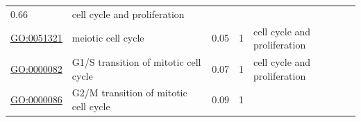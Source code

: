 \documentclass[
]{article}
\begin{document}
\begin{longtable}[]{@{}lllll@{}}
\begin{minipage}[t]{0.17\columnwidth}
0.66\strut
\end{minipage} & \begin{minipage}[t]{0.17\columnwidth}\raggedright
cell cycle and proliferation\strut
\end{minipage}\tabularnewline
\begin{minipage}[t]{0.17\columnwidth}\raggedright
\url{GO:0051321}\strut
\end{minipage} & \begin{minipage}[t]{0.17\columnwidth}\raggedright
meiotic cell cycle\strut
\end{minipage} & \begin{minipage}[t]{0.17\columnwidth}\raggedright
0.05\strut
\end{minipage} & \begin{minipage}[t]{0.17\columnwidth}\raggedright
1\strut
\end{minipage} & \begin{minipage}[t]{0.17\columnwidth}\raggedright
cell cycle and proliferation\strut
\end{minipage}\tabularnewline
\begin{minipage}[t]{0.17\columnwidth}\raggedright
\url{GO:0000082}\strut
\end{minipage} & \begin{minipage}[t]{0.17\columnwidth}\raggedright
G1/S transition of mitotic cell cycle\strut
\end{minipage} & \begin{minipage}[t]{0.17\columnwidth}\raggedright
0.07\strut
\end{minipage} & \begin{minipage}[t]{0.17\columnwidth}\raggedright
1\strut
\end{minipage} & \begin{minipage}[t]{0.17\columnwidth}\raggedright
cell cycle and proliferation\strut
\end{minipage}\tabularnewline
\begin{minipage}[t]{0.17\columnwidth}\raggedright
\url{GO:0000086}\strut
\end{minipage} & \begin{minipage}[t]{0.17\columnwidth}\raggedright
G2/M transition of mitotic cell cycle\strut
\end{minipage} & \begin{minipage}[t]{0.17\columnwidth}\raggedright
0.09\strut
\end{minipage} & \begin{minipage}[t]{0.17\columnwidth}\raggedright
1\strut
\end{minipage} & \begin{minipage}[t]{0.17\columnwidth}\raggedright

\end{minipage}
\end{longtable}
\end{document}
